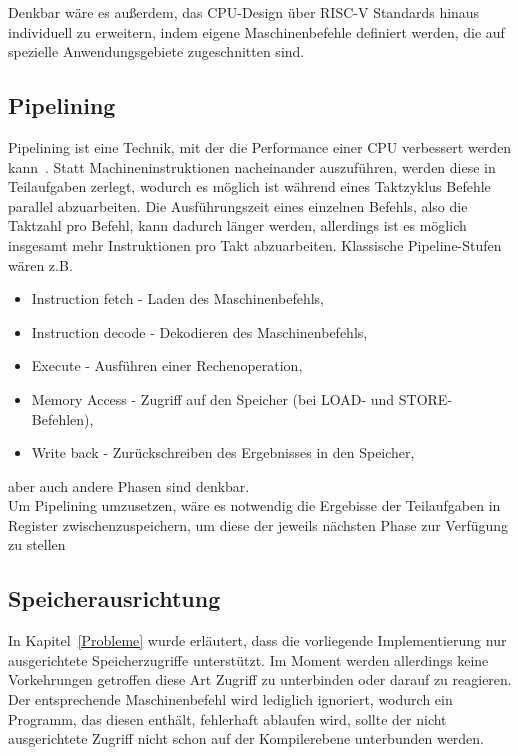 Denkbar wäre es außerdem, das CPU-Design über RISC-V Standards hinaus individuell zu erweitern, indem eigene Maschinenbefehle definiert werden, die auf spezielle Anwendungsgebiete zugeschnitten sind.

\subsection{Pipelining}

Pipelining ist eine Technik, mit der die Performance einer CPU verbessert werden kann~\cite[A.1]{Hennessy}.
Statt Machineninstruktionen nacheinander auszuführen, werden diese in Teilaufgaben zerlegt, wodurch es möglich ist während eines Taktzyklus Befehle parallel abzuarbeiten.
Die Ausführungszeit eines einzelnen Befehls, also die Taktzahl pro Befehl, kann dadurch länger werden, allerdings ist es möglich insgesamt mehr Instruktionen pro Takt abzuarbeiten.
Klassische Pipeline-Stufen wären z.B.
\begin{itemize}
    \item Instruction fetch - Laden des Maschinenbefehls,
    \item Instruction decode - Dekodieren des Maschinenbefehls,
    \item Execute - Ausführen einer Rechenoperation,
    \item Memory Access - Zugriff auf den Speicher (bei LOAD- und STORE-Befehlen),
    \item Write back - Zurückschreiben des Ergebnisses in den Speicher,
\end{itemize}
aber auch andere Phasen sind denkbar.\\
Um Pipelining umzusetzen, wäre es notwendig die Ergebisse der Teilaufgaben in Register zwischenzuspeichern, um diese der jeweils nächsten Phase zur Verfügung zu stellen





\subsection{Speicherausrichtung}
In Kapitel~\ref{Probleme} wurde erläutert, dass die vorliegende Implementierung nur ausgerichtete Speicherzugriffe unterstützt.
Im Moment werden allerdings keine Vorkehrungen getroffen diese Art Zugriff zu unterbinden oder darauf zu reagieren.
Der entsprechende Maschinenbefehl wird lediglich ignoriert, wodurch ein Programm, das diesen enthält, fehlerhaft ablaufen wird, sollte der nicht ausgerichtete Zugriff nicht schon auf der Kompilerebene unterbunden werden.

